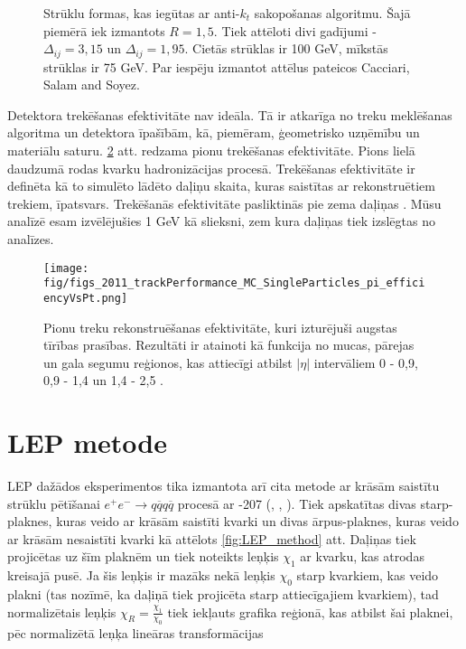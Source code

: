 \begin{figure}[hbtp]
  \def\twidth{0.5}
   \caption{Strūklu formas, kas iegūtas ar anti-$k_{t}$ sakopošanas algoritmu. Šajā piemērā iek izmantots $R=1,5$. Tiek attēloti divi gadījumi - $\Delta_{ij}=3,15$ un  $\Delta_{ij}=1,95$. Cietās strūklas \pt ir 100 GeV, mīkstās strūklas \pt ir 75 GeV. Par iespēju izmantot attēlus pateicos Cacciari, Salam and Soyez.}
  \label{fig:anti_kt}
\end{figure}

Detektora trekēšanas efektivitāte nav ideāla. Tā ir atkarīga no treku meklēšanas algoritma un detektora īpašībām, kā, piemēram, ģeometrisko \gls{uzņēmību} un materiālu saturu. \ref{fig:2011_trackPerformance_MC_SingleParticles_pi_efficiencyVsPt} att. redzama pionu trekēšanas efektivitāte. Pions lielā daudzumā rodas kvarku hadronizācijas procesā. Trekēšanas efektivitāte ir definēta kā to simulēto lādēto daļiņu skaita, kuras saistītas ar rekonstruētiem trekiem, īpatsvars. Trekēšanās efektivitāte pasliktinās pie zema daļiņas \pt. Mūsu analīzē esam izvēlējušies 1 GeV kā \pt slieksni, zem kura daļiņas tiek izslēgtas no analīzes.

\begin{figure}[hbtp]
    \texttt{[image: fig/figs\_2011\_trackPerformance\_MC\_SingleParticles\_pi\_efficiencyVsPt.png]}
    \caption{Pionu treku rekonstruēšanas efektivitāte, kuri izturējuši augstas tīrības prasības. Rezultāti ir atainoti kā funkcija no \pt mucas, pārejas un gala segumu reģionos, kas attiecīgi atbilst $\left|\eta\right|$ intervāliem 0 - 0,9, 0,9 - 1,4 un 1,4 - 2,5 \cite{Chatrchyan:2014fea}.}
    \label{fig:2011_trackPerformance_MC_SingleParticles_pi_efficiencyVsPt}
\end{figure}

\section{LEP metode}

LEP dažādos eksperimentos tika izmantota arī cita metode ar krāsām saistītu strūklu pētīšanai $e^{+}e^{-}\rightarrow q\overline{q}q\overline{q}$ procesā ar -207 \GeV (\cite{Abdallah:2006uq}, \cite{Abbiendi:2005es}, \cite{Achard:2003pe}). Tiek apskatītas divas starp-\PW plaknes, kuras veido ar krāsām saistīti kvarki un divas ārpus-\PW plaknes, kuras veido ar krāsām nesaistīti kvarki kā attēlots \ref{fig:LEP_method} att. Daļiņas tiek projicētas uz šīm plaknēm un tiek noteikts leņķis $\chi_{1}$ ar kvarku, kas atrodas kreisajā pusē. Ja šis leņķis ir mazāks nekā leņķis $\chi_{0}$ starp kvarkiem, kas veido plakni (tas nozīmē, ka daļiņā tiek projicēta starp attiecīgajiem kvarkiem), tad normalizētais leņķis $\chi_{R}=\frac{\chi_{1}}{\chi_{0}}$ tiek iekļauts grafika reģionā, kas atbilst šai plaknei, pēc normalizētā leņķa lineāras transformācijas

